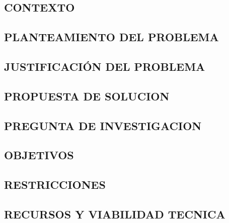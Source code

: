 \subsection{CONTEXTO}


\subsection{PLANTEAMIENTO DEL PROBLEMA}


\subsection{JUSTIFICACIÓN DEL PROBLEMA}


\subsection{PROPUESTA DE SOLUCION}


\subsection{PREGUNTA DE INVESTIGACION}


\subsection{OBJETIVOS}




\subsection{RESTRICCIONES}


\subsection{RECURSOS Y VIABILIDAD TECNICA}
